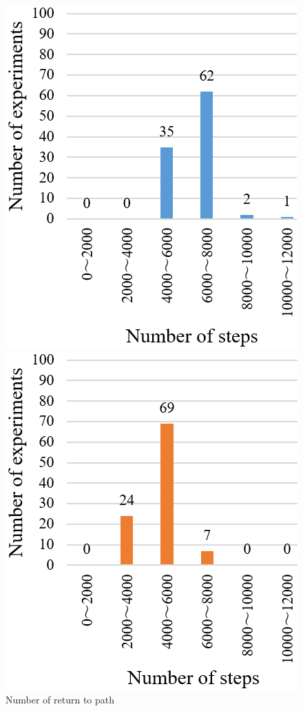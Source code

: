 \documentclass{jarticle}
\begin{document}
\begin{figure}[htbp]
  \begin{minipage}[t]{0.5\linewidth}
    \centering
    \includegraphics[keepaspectratio, scale=0.27]{./png/c.png}
  \end{minipage}
  \begin{minipage}[t]{0.5\linewidth}
    \centering
    \includegraphics[keepaspectratio, scale=0.273]{./png/p.png}
  \end{minipage}
  \caption{Number of return to path}
   \label{fig:11}
\end{figure}
\end{document}
